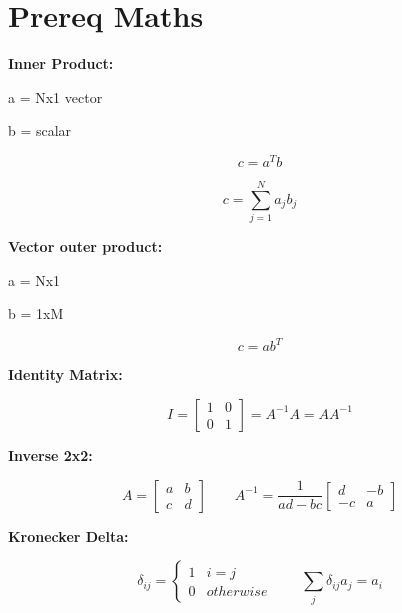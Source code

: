 \documentclass[]{article}
\date{}
\begin{document}
\hypertarget{prereq-maths}{%
\section{Prereq Maths}\label{prereq-maths}}

\textbf{Inner Product:}

a = Nx1 vector

b = scalar

\[ c=a^Tb \]

\[ c=\sum_{j=1}^Na_jb_j \]

\textbf{Vector outer product:}

a = Nx1

b = 1xM

\[ c=ab^T \]

\textbf{Identity Matrix:}

\[ I =\begin{bmatrix} 1 & 0 \\ 0 & 1 \end{bmatrix}=A^{-1}A=AA^{-1} \]

\textbf{Inverse 2x2:}

\[ A=\begin{bmatrix} a & b \\ c & d \end{bmatrix}\qquad A^{-1}=\frac{1}{ad-bc}\begin{bmatrix} d & -b \\ -c & a \end{bmatrix} \]

\textbf{Kronecker Delta:}

\[ \delta_{ij}=\begin{cases}1 & i=j \\ 0 & otherwise \end{cases}\qquad \sum_{j}\delta_{ij}a_j=a_i \]
\end{document}
